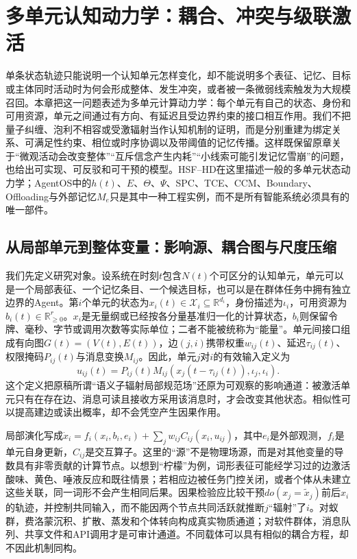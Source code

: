 \chapter{多单元认知动力学：耦合、冲突与级联激活}
\label{chp:many_body_cognitive_field}

单条状态轨迹只能说明一个认知单元怎样变化，却不能说明多个表征、记忆、目标或主体同时活动时为何会形成整体、发生冲突，或者被一条微弱线索触发为大规模召回。本章把这一问题表述为多单元计算动力学：每个单元有自己的状态、身份和可用资源，单元之间通过有方向、有延迟且受边界约束的接口相互作用。我们不把量子纠缠、泡利不相容或受激辐射当作认知机制的证明，而是分别重建为绑定关系、可满足性约束、相位或时序协调以及带阈值的记忆传播。这样既保留原章关于“微观活动会改变整体”“互斥信念产生内耗”“小线索可能引发记忆雪崩”的问题，也给出可实现、可反驳和可干预的模型。HSF--HD在这里描述一般的多单元状态动力学；AgentOS中的$h(t)$、$E$、$\Theta$、$\Psi$、SPC、TCE、CCM、Boundary、Offloading与外部记忆$M_e$只是其中一种工程实例，而不是所有智能系统必须具有的唯一部件。

\section{从局部单元到整体变量：影响源、耦合图与尺度压缩}
\label{sec:awakening_of_source_semantion_radiation}

我们先定义研究对象。设系统在时刻$t$包含$N(t)$个可区分的认知单元，单元可以是一个局部表征、一个记忆条目、一个候选目标，也可以是在群体任务中拥有独立边界的Agent。第$i$个单元的状态为$x_i(t)\in\mathcal X_i\subseteq\mathbb R^{d_i}$，身份描述为$\iota_i$，可用资源为$b_i(t)\in\mathbb R_{\geq0}^{r}$。$x_i$是无量纲或已经按各分量基准归一化的计算状态，$b_i$则保留令牌、毫秒、字节或调用次数等实际单位；二者不能被统称为“能量”。单元间接口组成有向图$G(t)=(V(t),E(t))$，边$(j,i)$携带权重$w_{ij}(t)$、延迟$\tau_{ij}(t)$、权限掩码$P_{ij}(t)$与消息变换$M_{ij}$。因此，单元$j$对$i$的有效输入定义为
\begin{equation}
u_{ij}(t)=P_{ij}(t)M_{ij}\!\left(x_j(t-\tau_{ij}(t)),\iota_j,\iota_i\right).
\end{equation}
这个定义把原稿所谓“语义子辐射局部规范场”还原为可观察的影响通道：被激活单元只有在存在边、消息可读且接收方采用该消息时，才会改变其他状态。相似性可以提高建边或读出概率，却不会凭空产生因果作用。

局部演化写成$\dot x_i=f_i(x_i,b_i,e_i)+\sum_j w_{ij}C_{ij}(x_i,u_{ij})$，其中$e_i$是外部观测，$f_i$是单元自身更新，$C_{ij}$是交互算子。这里的“源”不是物理场源，而是对其他变量的导数具有非零贡献的计算节点。以想到“柠檬”为例，词形表征可能经学习过的边激活酸味、黄色、唾液反应和既往情景；若相应边被任务门控关闭，或者个体从未建立这些关联，同一词形不会产生相同后果。因果检验应比较干预$do(x_j=\tilde x_j)$前后$x_i$的轨迹，并控制共同输入，而不能因两个节点共同活跃就推断$j$“辐射”了$i$。对蚁群，费洛蒙沉积、扩散、蒸发和个体转向构成真实物质通道；对软件群体，消息队列、共享文件和API调用才是可审计通道。不同载体可以具有相似的耦合方程，却不因此机制同构。

